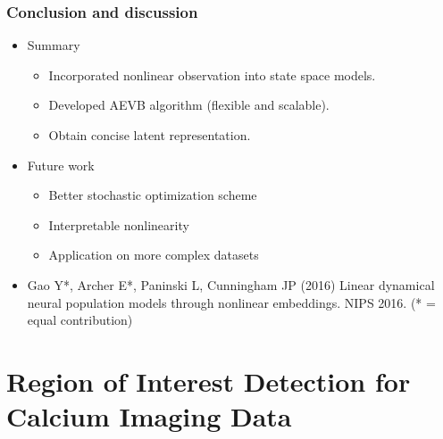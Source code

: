 \documentclass[16pt,presentation]{beamer}
\begin{document}
\begin{frame}
\frametitle{Conclusion and discussion}
\begin{itemize}
\item Summary
\begin{itemize}
\item Incorporated nonlinear observation into state space models.
\item Developed AEVB algorithm (flexible and scalable).
\item Obtain concise latent representation.
\end{itemize}
\item Future work
\begin{itemize}
\item Better stochastic optimization scheme
\item Interpretable nonlinearity
\item Application on more complex datasets
\end{itemize}
\item \alert{Gao Y}*, Archer E*, Paninski L, Cunningham JP (2016) Linear dynamical neural population models through nonlinear embeddings. NIPS 2016. (* = equal contribution)
\end{itemize}
\end{frame}


\section[]{Region of Interest Detection for Calcium Imaging Data}
\end{document}

